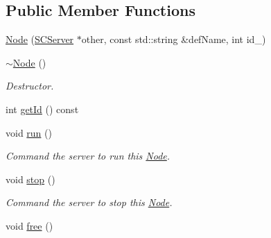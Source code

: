 \subsection*{Public Member Functions}
\begin{DoxyCompactItemize}
\item 
\hyperlink{classsc_1_1Node_aebe6b60f2f6312495480d0a2e01c7efa}{Node} (\hyperlink{classsc_1_1SCServer}{S\-C\-Server} $\ast$other, const std\-::string \&def\-Name, int id\-\_\-)
\item 
\hypertarget{classsc_1_1Node_a12fa05f533aa00bf553b9a46db1fcd45}{\hyperlink{classsc_1_1Node_a12fa05f533aa00bf553b9a46db1fcd45}{$\sim$\-Node} ()}\label{classsc_1_1Node_a12fa05f533aa00bf553b9a46db1fcd45}

\begin{DoxyCompactList}\small\item\em Destructor. \end{DoxyCompactList}\item 
int \hyperlink{classsc_1_1Node_ae9fd8f68186f13b1402c542192b98e63}{get\-Id} () const 
\item 
\hypertarget{classsc_1_1Node_a21719bc1c64204fe09351e42f2dc4894}{void \hyperlink{classsc_1_1Node_a21719bc1c64204fe09351e42f2dc4894}{run} ()}\label{classsc_1_1Node_a21719bc1c64204fe09351e42f2dc4894}

\begin{DoxyCompactList}\small\item\em Command the server to run this \hyperlink{classsc_1_1Node}{Node}. \end{DoxyCompactList}\item 
\hypertarget{classsc_1_1Node_add380fd85522a490d326a49e3278df4e}{void \hyperlink{classsc_1_1Node_add380fd85522a490d326a49e3278df4e}{stop} ()}\label{classsc_1_1Node_add380fd85522a490d326a49e3278df4e}

\begin{DoxyCompactList}\small\item\em Command the server to stop this \hyperlink{classsc_1_1Node}{Node}. \end{DoxyCompactList}\item 
\hypertarget{classsc_1_1Node_a5e78540a85cd945dabb0f5cf9571fd03}{void \hyperlink{classsc_1_1Node_a5e78540a85cd945dabb0f5cf9571fd03}{free} ()}\label{classsc_1_1Node_a5e78540a85cd945dabb0f5cf9571fd03}


\end{DoxyCompactItemize}
